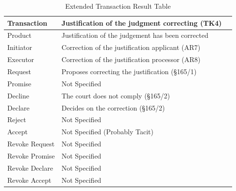 \begin{landscape}
\begin{table}[h]
\caption{Extended Transaction Result Table}
\label{tab:etrt}
\begin{tabular}{|l||l|l|}
\hline
Transaction  &  Justification of the judgment correcting (TK4) \\ \hline
Product      & Justification of the judgement has been corrected \\ \hline
Initiator      &  Correction of the justification applicant (AR7) \\ \hline
Executor       &  Correction of the justification processor  (AR8)      \\ \hline
Request        &  Proposes correcting the justification (\S165/1)   \\ \hline
Promise        &  Not Specified  \\ \hline
Decline        &  The court does not comply (\S165/2)  \\ \hline
Declare        &  Decides on the correction (\S165/2) \\ \hline
Reject         &  Not Specified   \\ \hline
Accept         &  Not Specified (Probably Tacit) \\ \hline
Revoke Request &  Not Specified        \\ \hline
Revoke Promise & Not Specified     \\ \hline
Revoke Declare & Not Specified       \\ \hline
Revoke Accept  &  Not Specified     \\ \hline
\end{tabular}
\end{table}


\end{landscape}
